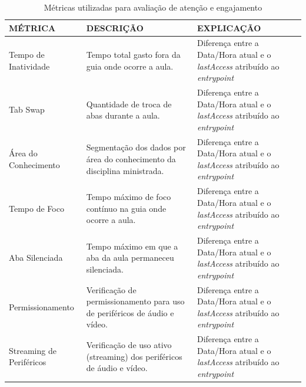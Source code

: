 \begin{table}[H]
    \centering
    \caption{Métricas utilizadas para avaliação de atenção e engajamento}
    \label{tab:table1}
    \begin{tabular}{|l|p{4cm}|p{6cm}|} 
        \hline
        \textbf{MÉTRICA}                       & \textbf{DESCRIÇÃO}                                                                         & \textbf{EXPLICAÇÃO}                                                                        \\
        \hline
        Tempo de Inatividade                   & Tempo total gasto fora da guia onde ocorre a aula.                                         & Diferença entre a Data/Hora atual e o \textit{lastAccess} atribuído ao \textit{entrypoint} \\
        \hline
        Tab Swap                               & Quantidade de troca de abas durante a aula.                                                & Diferença entre a Data/Hora atual e o \textit{lastAccess} atribuído ao \textit{entrypoint} \\
        \hline
        Área do Conhecimento                   & Segmentação dos dados por área do
        conhecimento da disciplina ministrada. & Diferença entre a Data/Hora atual e o \textit{lastAccess} atribuído ao \textit{entrypoint}                                                                                              \\
        \hline
        Tempo de Foco                          & Tempo máximo de foco contínuo na guia onde ocorre a aula.                                  & Diferença entre a Data/Hora atual e o \textit{lastAccess} atribuído ao \textit{entrypoint} \\
        \hline
        Aba Silenciada                         & Tempo máximo em que a aba da aula permaneceu silenciada.                                   & Diferença entre a Data/Hora atual e o \textit{lastAccess} atribuído ao \textit{entrypoint} \\
        \hline
        Permissionamento                       & Verificação de permissionamento para uso de periféricos de áudio e vídeo.                  & Diferença entre a Data/Hora atual e o \textit{lastAccess} atribuído ao \textit{entrypoint} \\
        \hline
        Streaming de Periféricos               & Verificação de uso ativo (streaming) dos periféricos de áudio e vídeo.                     & Diferença entre a Data/Hora atual e o \textit{lastAccess} atribuído ao \textit{entrypoint} \\
        \hline
    \end{tabular}
\end{table}


